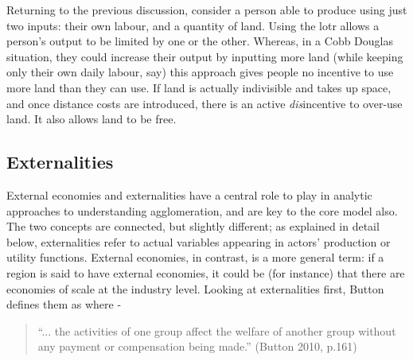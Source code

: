 Returning to the previous discussion, consider a person able to produce using just two inputs: their own labour, and a quantity of land. Using the \gls{lotr} allows a person's output to be limited by one or the other. Whereas, in a Cobb Douglas situation, they could increase their output by inputting more land (while keeping only their own daily labour, say) this approach gives people no incentive to use more land than they can use. If land is actually indivisible and takes up space, and once distance costs are introduced, there is an active \emph{dis}incentive to over-use land. It also allows land to be free.





\subsection{Externalities \label{sec:externalities}}

External economies and externalities have a central role to play in analytic approaches to understanding agglomeration, and are key to the core model also. The two concepts are connected, but slightly different; as explained in detail below, externalities refer to actual variables appearing in actors' production or utility functions. External economies, in contrast, is a more general term: if a region is said to have external economies, it could be (for instance) that there are economies of scale at the industry level. Looking at externalities first, Button defines them as where - 

\begin{quote}
``... the activities of one group affect the welfare of another group without any payment or compensation being made.'' (Button 2010, p.161) 
\end{quote}


